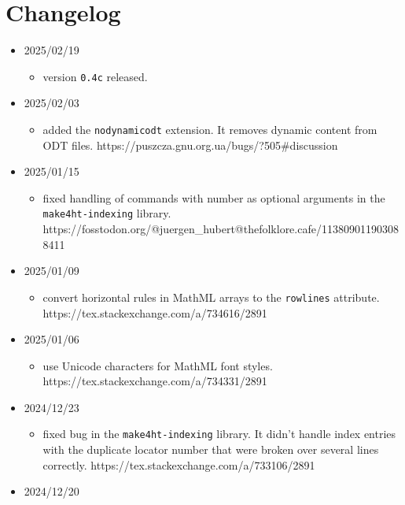 \section{Changelog}\label{changelog}

\begin{itemize}
\item
  2025/02/19

  \begin{itemize}
  \tightlist
  \item
    version \texttt{0.4c} released.
  \end{itemize}
\item
  2025/02/03

  \begin{itemize}
  \tightlist
  \item
    added the \texttt{nodynamicodt} extension. It removes dynamic
    content from ODT files.
    https://puszcza.gnu.org.ua/bugs/?505\#discussion
  \end{itemize}
\item
  2025/01/15

  \begin{itemize}
  \tightlist
  \item
    fixed handling of commands with number as optional arguments in the
    \texttt{make4ht-indexing} library.
    https://fosstodon.org/@juergen\_hubert@thefolklore.cafe/113809011903088411
  \end{itemize}
\item
  2025/01/09

  \begin{itemize}
  \tightlist
  \item
    convert horizontal rules in MathML arrays to the \texttt{rowlines}
    attribute. https://tex.stackexchange.com/a/734616/2891
  \end{itemize}
\item
  2025/01/06

  \begin{itemize}
  \tightlist
  \item
    use Unicode characters for MathML font styles.
    https://tex.stackexchange.com/a/734331/2891
  \end{itemize}
\item
  2024/12/23

  \begin{itemize}
  \tightlist
  \item
    fixed bug in the \texttt{make4ht-indexing} library. It didn't handle
    index entries with the duplicate locator number that were broken
    over several lines correctly.
    https://tex.stackexchange.com/a/733106/2891
  \end{itemize}
\item
  2024/12/20


\end{itemize}
